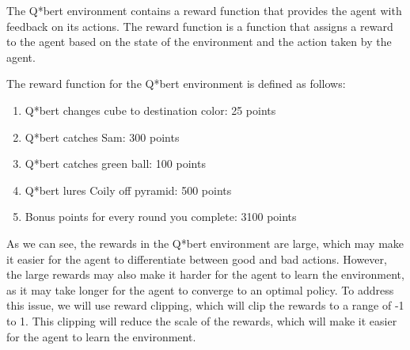 The Q*bert environment contains a reward function that provides the agent
with feedback on its actions. The reward function is a function that assigns a
reward to the agent based on the state of the environment and the action taken
by the agent.

The reward function for the Q*bert environment is defined as follows:
\begin{enumerate}
    \item Q*bert changes cube to destination color: 25 points
    \item Q*bert catches Sam: 300 points
    \item Q*bert catches green ball: 100 points
    \item Q*bert lures Coily off pyramid: 500 points
    \item Bonus points for every round you complete: 3100 points
\end{enumerate}

As we can see, the rewards in the Q*bert environment are large, which may make
it easier for the agent to differentiate between good and bad actions. However,
the large rewards may also make it harder for the agent to learn the
environment, as it may take longer for the agent to converge to an optimal
policy. To address this issue, we will use reward clipping, which will clip the
rewards to a range of -1 to 1. This clipping will reduce the scale of the
rewards, which will make it easier for the agent to learn the environment.